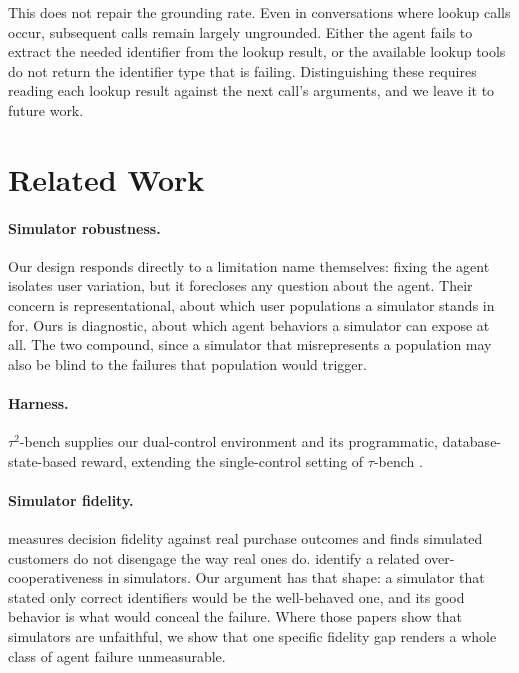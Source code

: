 \documentclass{article}
\begin{document}
This does not repair the grounding rate. Even in conversations where lookup calls occur, subsequent calls remain largely ungrounded. Either the agent fails to extract the needed identifier from the lookup result, or the available lookup tools do not return the identifier type that is failing. Distinguishing these requires reading each lookup result against the next call's arguments, and we leave it to future work.

\section{Related Work}

\paragraph{Simulator robustness.} Our design responds directly to a limitation \citet{seshadri2026lost} name themselves: fixing the agent isolates user variation, but it forecloses any question about the agent. Their concern is representational, about which user populations a simulator stands in for. Ours is diagnostic, about which agent behaviors a simulator can expose at all. The two compound, since a simulator that misrepresents a population may also be blind to the failures that population would trigger.

\paragraph{Harness.} $\tau^2$-bench \citep{barres2025tau2} supplies our dual-control environment and its programmatic, database-state-based reward, extending the single-control setting of $\tau$-bench \citep{yao2024tau}.

\paragraph{Simulator fidelity.} \citet{chen2026simulated} measures decision fidelity against real purchase outcomes and finds simulated customers do not disengage the way real ones do. \citet{nakash2026efficient} identify a related over-cooperativeness in simulators. Our argument has that shape: a simulator that stated only correct identifiers would be the well-behaved one, and its good behavior is what would conceal the failure. Where those papers show that simulators are unfaithful, we show that one specific fidelity gap renders a whole class of agent failure unmeasurable.
\end{document}
